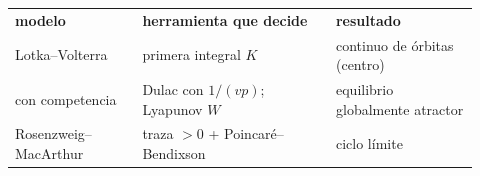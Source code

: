 \begin{ideaclave}
\begin{tabular}{@{}>{\raggedright}p{0.25\linewidth}>{\raggedright}p{0.38\linewidth}>{\raggedright\arraybackslash}p{0.29\linewidth}@{}}
\textbf{modelo} & \textbf{herramienta que decide} & \textbf{resultado}\\
Lotka--Volterra & primera integral $K$ & continuo de órbitas (centro)\\
con competencia & Dulac con $1/(vp)$; Lyapunov $W$ & equilibrio globalmente atractor\\
Rosenzweig--MacArthur & traza $>0$ + Poincaré--Bendixson & ciclo límite
\end{tabular}
\end{ideaclave}
